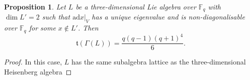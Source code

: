 \documentclass[11pt]{amsart}
\theoremstyle{plain}
\newtheorem{proposition}[theorem]{Proposition}
\def\F{\mathbb{F}}
\def\ad{\mathrm{ad}}
\begin{document}
\begin{proposition}\label{1EigenVal}
Let $L$ be a three-dimensional Lie algebra over $\F_q$ with $\dim L'=2$ such that
$\ad x |_V$ has a unique eigenvalue and is non-diagonalisable over $\F_q$
for some $x\notin L'$.  Then  
\[ \mathfrak{t}(\Gamma(L)) = \frac{q(q-1)(q+1)^4}{6}.\]
\end{proposition}

\begin{proof}
In this case, $L$ has the same subalgebra lattice as the three-dimensional Heisenberg algebra







\end{proof}
\end{document}
